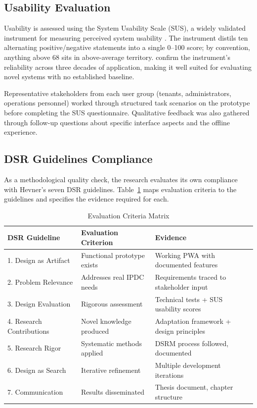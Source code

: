 \subsection{Usability Evaluation}

Usability is assessed using the System Usability Scale (SUS), a widely validated instrument for measuring perceived system usability \citep{Nielsen1993, Brooke1996}. The instrument distils ten alternating positive/negative statements into a single 0--100 score; by convention, anything above 68 sits in above-average territory. \citet{Lewis2018} confirm the instrument's reliability across three decades of application, making it well suited for evaluating novel systems with no established baseline.

Representative stakeholders from each user group (tenants, administrators, operations personnel) worked through structured task scenarios on the prototype before completing the SUS questionnaire. Qualitative feedback was also gathered through follow-up questions about specific interface aspects and the offline experience.

\subsection{DSR Guidelines Compliance}

As a methodological quality check, the research evaluates its own compliance with Hevner's seven DSR guidelines. Table~\ref{tab:eval-criteria} maps evaluation criteria to the guidelines and specifies the evidence required for each.

\begin{table}[H]
\centering
\caption{Evaluation Criteria Matrix}
\label{tab:eval-criteria}
\small
\begin{tabular}{p{3cm}p{4cm}p{5cm}}
\toprule
\textbf{DSR Guideline} & \textbf{Evaluation Criterion} & \textbf{Evidence} \\
\midrule
1. Design as Artifact & Functional prototype exists & Working PWA with documented features \\
2. Problem Relevance & Addresses real IPDC needs & Requirements traced to stakeholder input \\
3. Design Evaluation & Rigorous assessment & Technical tests + SUS usability scores \\
4. Research Contributions & Novel knowledge produced & Adaptation framework + design principles \\
5. Research Rigor & Systematic methods applied & DSRM process followed, documented \\
6. Design as Search & Iterative refinement & Multiple development iterations \\
7. Communication & Results disseminated & Thesis document, chapter structure \\
\bottomrule
\end{tabular}
\end{table}

